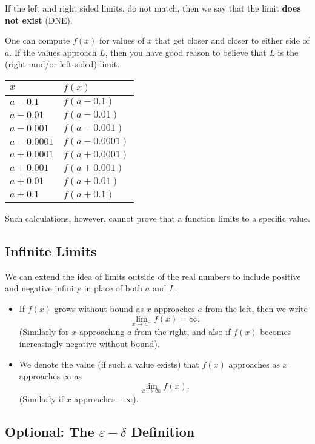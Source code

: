 If the left and right sided limits, do not match, then we say that the limit \textbf{does not exist} (DNE).

One can compute $f(x)$ for values of $x$ that get closer and closer to either side of $a$. If the values approach $L$, then you have good reason to believe that $L$ is the (right- and/or left-sided) limit.

\begin{center}
\begin{tabular}{@{}ll@{}}
\toprule[0.4mm]
   $x$        & $f(x)$        \\
\midrule
   $a-0.1$    & $f(a-0.1)$    \\
   $a-0.01$   & $f(a-0.01)$   \\
   $a-0.001$  & $f(a-0.001)$  \\
   $a-0.0001$ & $f(a-0.0001)$ \\
\midrule
   $a+0.0001$ & $f(a+0.0001)$ \\
   $a+0.001$  & $f(a+0.001)$  \\
   $a+0.01$   & $f(a+0.01)$   \\
   $a+0.1$    & $f(a+0.1)$    \\
\bottomrule[0.4mm]
\end{tabular}
\end{center}
Such calculations, however, cannot prove that a function limits to a specific value.


\subsection{Infinite Limits}

We can extend the idea of limits outside of the real numbers to include positive and negative infinity in place of both $a$ and $L$.
\begin{itemize}
\item If $f(x)$ grows without bound as $x$ approaches $a$ from the left, then we write $$\lim_{x\to a^-}f(x)=\infty.$$
(Similarly for $x$ approaching $a$ from the right, and also if $f(x)$ becomes increasingly negative without bound).
\item We denote the value (if such a value exists) that $f(x)$ approaches as $x$ approaches $\infty$ as $$\lim_{x\to\infty} f(x).$$
(Similarly if $x$ approaches $-\infty$).
\end{itemize}


\subsection{Optional: The $\varepsilon-\delta$ Definition}

